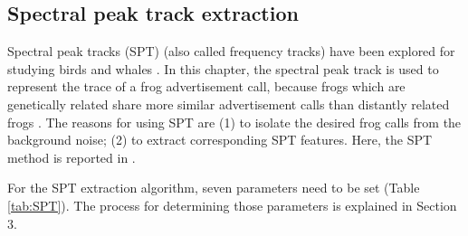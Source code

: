 %
%
%
 


\subsection{Spectral peak track extraction}
Spectral peak tracks (SPT) (also called frequency tracks) have been explored for studying birds \citep{birdTrack, jasaTrack} and whales \citep{roch2011automated}. In this chapter, the spectral peak track is used to represent the trace of a frog advertisement call, because frogs which are genetically related share more similar advertisement calls than distantly related frogs \citep{Gingras2013}. The reasons for using SPT are (1) to isolate the desired frog calls from the background noise; (2) to extract corresponding SPT features. Here, the SPT method is reported in \citep{Xie1504:Acoustic}. 

For the SPT extraction algorithm, seven parameters need to be set (Table \ref{tab:SPT}). The process for determining those parameters is explained in Section 3. 


